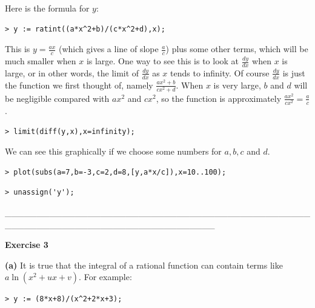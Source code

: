 \documentclass{article}
\begin{document}
\begin{Maple Normal}
Here is the formula for 
$y$:
\end{Maple Normal}
\begin{lstlisting}
> y := ratint((a*x^2+b)/(c*x^2+d),x);
\end{lstlisting}
\begin{Maple Normal}
This is 
$y =\frac{a x}{c}$ (which gives a line of slope 
$\frac{a}{c}$) plus some other terms, which will be much smaller when 
$x$ is large.  One way to see this is to look at  
$\frac{\mathit{dy}}{\mathit{dx}}$ when 
$x$ is large, or in other words, the limit of 
$\frac{\mathit{dy}}{\mathit{dx}}$ as 
$x$ tends to infinity.  Of course 
$\frac{\mathit{dy}}{\mathit{dx}}$ is just the function we first thought of, namely 
$\frac{a x^{2}+b}{c x^{2}+d}$.  When 
$x$ is very large, 
$b$ and 
$d$ will be negligible compared with 
$a x^{2}$ and 
$c x^{2}$, so the function is approximately 
$\frac{a x^{2}}{c x^{2}}=\frac{a}{c}$.
\end{Maple Normal}
\begin{lstlisting}
> limit(diff(y,x),x=infinity);
\end{lstlisting}
\begin{Maple Normal}

\end{Maple Normal}
\begin{Maple Normal}
We can see this graphically if we choose some numbers for 
$a ,b ,c$ and 
$d$.
\end{Maple Normal}
\begin{lstlisting}
> plot(subs(a=7,b=-3,c=2,d=8,[y,a*x/c]),x=10..100);
\end{lstlisting}
\begin{lstlisting}
> unassign('y');
\end{lstlisting}
\begin{Maple Normal}
\_\_\_\_\_\_\_\_\_\_\_\_\_\_\_\_\_\_\_\_\_\_\_\_\_\_\_\_\_\_\_\_\_\_\_\_\_\_\_\_\_\_\_\_\_\_\_\_\_\_\_\_\_\_\_\_\_\_\_\_\_\_\_\_\_\_\_\_\_\_\_\_\_\_\_\_\_\_\_\_\_
\end{Maple Normal}
\begin{Maple Heading 2}
\textbf{Exercise 3}
\end{Maple Heading 2}
\begin{Maple Normal}
\textbf{(a)} It is true that the integral of a rational function can contain terms like 
$a \ln (x^{2}+u x +v)$.  For example:
\end{Maple Normal}
\begin{lstlisting}
> y := (8*x+8)/(x^2+2*x+3);
\end{lstlisting}
\end{document}
